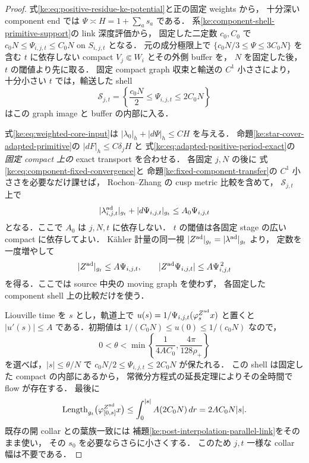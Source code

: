 \begin{proof}
式\eqref{ke:eq:positive-residue-ke-potential}と正の固定 weights から，
十分深い component end では \(\Psi\asymp H=1+\sum_as_a\) である．
系\ref{ke:component-shell-primitive-support}の link 深度評価から，
固定した二定数 \(c_0,C_0\) で
\(c_0N\le\Psi_{i,j,t}\le C_0N\) on \(S_{i,j,t}\) となる．
元の成分極限上で
\(\{c_0N/3\le\Psi\le3C_0N\}\) を含む
\(t\) に依存しない compact \(V_j\Subset W_i\) とその外側 buffer を，
\(N\) を固定した後，\(t\) の閾値より先に取る．
固定 compact graph 収束と輸送の \(C^1\) 小ささにより，
十分小さい \(t\) では，輸送した shell
\[
 \mathcal S_{j,t}
 =\left\{\frac{c_0N}{2}\le\Psi_{i,j,t}\le2C_0N\right\}
\]
はこの graph image と buffer の内部に入る．

式\eqref{ke:eq:weighted-core-input}は
\(\lvert\lambda_0\rvert_h+\lvert d\Psi\rvert_h\le CH\) を与える．
命題\ref{ke:star-cover-adapted-primitive}の
\(\lvert dF\rvert_h\le C\delta_jH\) と
式\eqref{ke:eq:adapted-positive-period-exact}の
\emph{固定 compact 上の} exact transport を合わせる．
各固定 \(j,N\) の後に
式\eqref{ke:eq:component-fixed-convergence}と
命題\ref{ke:fixed-component-transfer}の
\(C^1\) 小ささを必要なだけ課せば，
Rochon--Zhang の cusp metric 比較を含めて，
\(\mathcal S_{j,t}\) 上で
\[
 \lvert\lambda^{\rm ad}_{i,j,t}\rvert_{g_t}
 +\lvert d\Psi_{i,j,t}\rvert_{g_t}
 \le A_0\Psi_{i,j,t}
\]
となる．ここで \(A_0\) は \(j,N,t\) に依存しない．
\(t\) の閾値は各固定 stage の広い compact に依存してよい．
Kähler 計量の同一視
\(\lvert Z^{\rm ad}\rvert_{g_t}
 =\lvert\lambda^{\rm ad}\rvert_{g_t}\) より，
定数を一度増やして
\[
 \lvert Z^{\rm ad}\rvert_{g_t}\le A\Psi_{i,j,t},
 \qquad
 \lvert Z^{\rm ad}\Psi_{i,j,t}\rvert
 \le A\Psi_{i,j,t}^{\,2}
\]
を得る．ここでは source 中央の moving graph を使わず，
各固定した component shell 上の比較だけを使う．

Liouville time を \(s\) とし，軌道上で
\(u(s)=1/\Psi_{i,j,t}(\varphi_s^{Z^{\rm ad}}x)\) と置くと
\(\lvert u'(s)\rvert\le A\) である．初期値は
\(1/(C_0N)\le u(0)\le1/(c_0N)\) なので，
\[
 0<\theta<
 \min\left\{\frac{1}{4AC_0},
                \frac{4\pi}{128\rho_+}\right\}
\]
を選べば，\(\lvert s\rvert\le\theta/N\) で
\(c_0N/2\le\Psi_{i,j,t}\le2C_0N\) が保たれる．
この shell は固定した compact の内部にあるから，
常微分方程式の延長定理によりその全時間で flow が存在する．
最後に
\[
 \operatorname{Length}_{g_t}
 \bigl(\varphi_{[0,s]}^{Z^{\rm ad}}x\bigr)
 \le\int_0^{\lvert s\rvert}A(2C_0N)\,dr
 =2AC_0N\lvert s\rvert .
\]
既存の開 collar との葉族一致には
補題\ref{ke:post-interpolation-parallel-link}をそのまま使い，
その \(s_0\) を必要ならさらに小さくする．
このため \(j,t\) 一様な collar 幅は不要である．
\end{proof}


